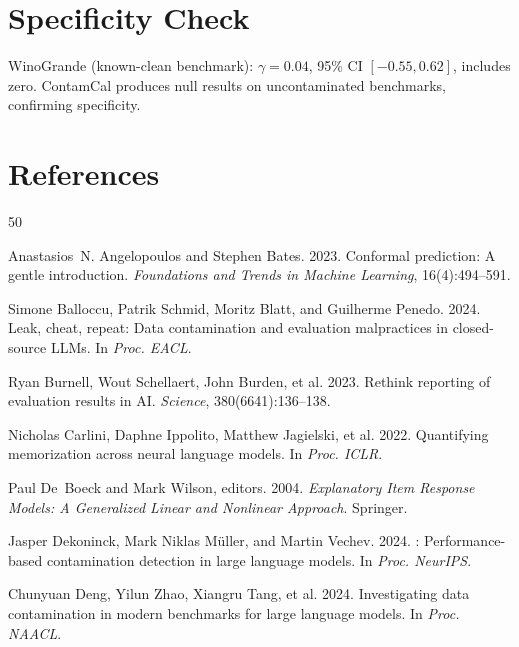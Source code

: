 \documentclass[11pt,a4paper]{article}
\begin{document}
\section{Specificity Check}

WinoGrande (known-clean benchmark): $\gamma = 0.04$, 95\% CI $[-0.55, 0.62]$, includes zero. ContamCal produces null results on uncontaminated benchmarks, confirming specificity.

\section*{References}

\begin{thebibliography}{50}

Anastasios~N. Angelopoulos and Stephen Bates. 2023.
\newblock Conformal prediction: A gentle introduction.
\newblock \emph{Foundations and Trends in Machine Learning}, 16(4):494--591.

Simone Balloccu, Patrik Schmid, Moritz Blatt, and Guilherme Penedo. 2024.
\newblock Leak, cheat, repeat: Data contamination and evaluation malpractices in closed-source {LLM}s.
\newblock In \emph{Proc. EACL}.

Ryan Burnell, Wout Schellaert, John Burden, et al. 2023.
\newblock Rethink reporting of evaluation results in {AI}.
\newblock \emph{Science}, 380(6641):136--138.

Nicholas Carlini, Daphne Ippolito, Matthew Jagielski, et al. 2022.
\newblock Quantifying memorization across neural language models.
\newblock In \emph{Proc. ICLR}.

Paul De~Boeck and Mark Wilson, editors. 2004.
\newblock \emph{Explanatory Item Response Models: A Generalized Linear and Nonlinear Approach}.
\newblock Springer.

Jasper Dekoninck, Mark Niklas M{\"u}ller, and Martin Vechev. 2024.
: Performance-based contamination detection in large language models.
\newblock In \emph{Proc. NeurIPS}.

Chunyuan Deng, Yilun Zhao, Xiangru Tang, et al. 2024.
\newblock Investigating data contamination in modern benchmarks for large language models.
\newblock In \emph{Proc. NAACL}.


\end{thebibliography}
\end{document}
